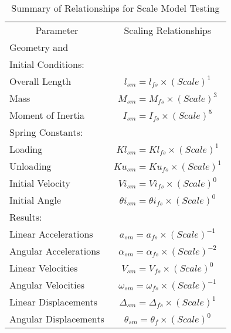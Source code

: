 \begin{table}
\begin{center}
\caption{Summary of Relationships for Scale Model Testing}
\makeqnum
\begin{tabular}{||l|c||}
\hline
\multicolumn{1}{|c}{Parameter}
 &\multicolumn{1}{|c||}{Scaling Relationships}\\
Geometry and & \\
Initial Conditions: &\\
\quad Overall Length     & $l_{sm} = l_{fs} \times (Scale)^{1}$\\
\quad Mass               & $M_{sm} = M_{fs} \times (Scale)^{3}$\\
\quad Moment of Inertia  & $I_{sm} = I_{fs} \times (Scale)^{5}$\\
\quad Spring Constants: &\\
\quad \quad Loading      & $Kl_{sm} = Kl_{fs} \times (Scale)^{1}$\\
\quad \quad Unloading    & $Ku_{sm} = Ku_{fs} \times (Scale)^{1}$\\
\quad Initial Velocity   & $Vi_{sm} = Vi_{fs} \times (Scale)^{0}$\\
\quad Initial Angle      & $\theta i_{sm} = \theta i_{fs} \times 
(Scale)^{0}$\\
\hline
Results: & \\
\quad    Linear Accelerations  & $a_{sm} = a_{fs} \times (Scale)^{-1}$\\
\quad    Angular Accelerations & $\alpha _{sm} = \alpha _{fs} \times 
(Scale)^{-2}$\\
\quad    Linear Velocities     & $V_{sm} = V_{fs} \times (Scale)^{0}$\\
\quad    Angular Velocities    & $\omega _{sm} = \omega _{fs} \times 
(Scale)^{-1}$\\
\quad    Linear Displacements  & $\Delta _{sm} = \Delta _{fs} \times 
(Scale)^{1}$\\
\quad    Angular Displacements & $\theta _{sm} = \theta _{f} \times 
(Scale)^{0}$\\
\hline
\end{tabular}
\end{center}
\end{table}

